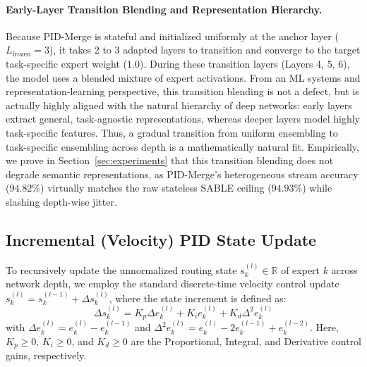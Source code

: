 \paragraph{Early-Layer Transition Blending and Representation Hierarchy.}
Because PID-Merge is stateful and initialized uniformly at the anchor layer ($L_{\text{frozen}} = 3$), it takes $2$ to $3$ adapted layers to transition and converge to the target task-specific expert weight ($1.0$). During these transition layers (Layers 4, 5, 6), the model uses a blended mixture of expert activations. From an ML systems and representation-learning perspective, this transition blending is not a defect, but is actually highly aligned with the natural hierarchy of deep networks: early layers extract general, task-agnostic representations, whereas deeper layers model highly task-specific features. Thus, a gradual transition from uniform ensembling to task-specific ensembling across depth is a mathematically natural fit. Empirically, we prove in Section~\ref{sec:experiments} that this transition blending does not degrade semantic representations, as PID-Merge's heterogeneous stream accuracy ($94.82\%$) virtually matches the raw stateless SABLE ceiling ($94.93\%$) while slashing depth-wise jitter.

\subsection{Incremental (Velocity) PID State Update}
To recursively update the unnormalized routing state $s_k^{(l)} \in \mathbb{R}$ of expert $k$ across network depth, we employ the standard discrete-time velocity control update $s_k^{(l)} = s_k^{(l-1)} + \Delta s_k^{(l)}$, where the state increment is defined as:
\begin{equation}
\Delta s_k^{(l)} = K_p \Delta e_k^{(l)} + K_i e_k^{(l)} + K_d \Delta^2 e_k^{(l)}
\label{eq:pid_increment}
\end{equation}
with $\Delta e_k^{(l)} = e_k^{(l)} - e_k^{(l-1)}$ and $\Delta^2 e_k^{(l)} = e_k^{(l)} - 2e_k^{(l-1)} + e_k^{(l-2)}$. Here, $K_p \ge 0$, $K_i \ge 0$, and $K_d \ge 0$ are the Proportional, Integral, and Derivative control gains, respectively.

